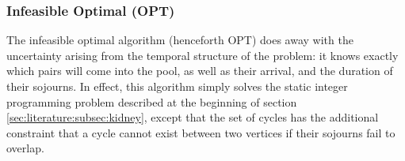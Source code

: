 \documentclass[12pt]{article}
\begin{document}
\subsubsection{Infeasible Optimal (OPT)}

The infeasible optimal algorithm (henceforth OPT) does away with the uncertainty arising from the temporal structure of the problem: it knows exactly which pairs will come into the pool, as well as their arrival, and the duration of their sojourns. In effect, this algorithm simply solves the static integer programming problem described at the beginning of section \ref{sec:literature:subsec:kidney}, except that the set of cycles has the additional constraint that a cycle cannot exist between two vertices if their sojourns fail to overlap.
\end{document}
